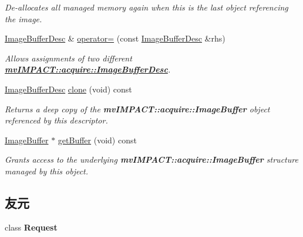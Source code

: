 \begin{DoxyCompactItemize}
\begin{DoxyCompactList}\small\item\em De-\/allocates all managed memory again when this is the last object referencing the image. \end{DoxyCompactList}\item 
\hyperlink{classmv_i_m_p_a_c_t_1_1acquire_1_1_image_buffer_desc}{Image\+Buffer\+Desc} \& \hyperlink{classmv_i_m_p_a_c_t_1_1acquire_1_1_image_buffer_desc_a6a46b9a7dd0af67cff75ef11e062942d}{operator=} (const \hyperlink{classmv_i_m_p_a_c_t_1_1acquire_1_1_image_buffer_desc}{Image\+Buffer\+Desc} \&rhs)
\begin{DoxyCompactList}\small\item\em Allows assignments of two different {\bfseries \hyperlink{classmv_i_m_p_a_c_t_1_1acquire_1_1_image_buffer_desc}{mv\+I\+M\+P\+A\+C\+T\+::acquire\+::\+Image\+Buffer\+Desc}}. \end{DoxyCompactList}\item 
\hyperlink{classmv_i_m_p_a_c_t_1_1acquire_1_1_image_buffer_desc}{Image\+Buffer\+Desc} \hyperlink{classmv_i_m_p_a_c_t_1_1acquire_1_1_image_buffer_desc_a5a4f72beeb3980f97d6c49a85862fde8}{clone} (void) const 
\begin{DoxyCompactList}\small\item\em Returns a deep copy of the {\bfseries mv\+I\+M\+P\+A\+C\+T\+::acquire\+::\+Image\+Buffer} object referenced by this descriptor. \end{DoxyCompactList}\item 
\hyperlink{struct_image_buffer}{Image\+Buffer} $\ast$ \hyperlink{classmv_i_m_p_a_c_t_1_1acquire_1_1_image_buffer_desc_a35278f732a39a7e0b18f99e5768dcd71}{get\+Buffer} (void) const 
\begin{DoxyCompactList}\small\item\em Grants access to the underlying {\bfseries mv\+I\+M\+P\+A\+C\+T\+::acquire\+::\+Image\+Buffer} structure managed by this object. \end{DoxyCompactList}\end{DoxyCompactItemize}
\subsection*{友元}
\begin{DoxyCompactItemize}
\item 
\hypertarget{classmv_i_m_p_a_c_t_1_1acquire_1_1_image_buffer_desc_a5719d6ff12298e668b17796c87450d5b}{class {\bfseries Request}}\label{classmv_i_m_p_a_c_t_1_1acquire_1_1_image_buffer_desc_a5719d6ff12298e668b17796c87450d5b}

\end{DoxyCompactItemize}


